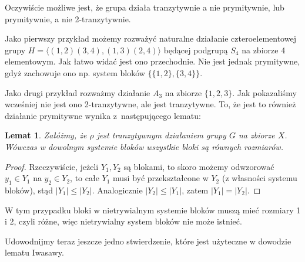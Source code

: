 \documentclass[licencjacka]{pracamgr}
\newtheorem{lemma}{Lemat}[section]
\begin{document}
Oczywiście możliwe jest, że grupa działa tranzytywnie a nie
prymitywnie, lub prymitywnie, a nie 2-tranzytywnie.

Jako pierwszy przykład możemy rozważyć naturalne działanie
czteroelementowej grupy $H= \langle (1,2)(3,4), (1,3)(2,4) \rangle$
będącej podgrupą $S_4$ na zbiorze 4 elementowym. Jak łatwo widać
jest ono przechodnie. Nie jest jednak prymitywne, gdyż zachowuje ono
np. system bloków $\{\{1,2\}, \{3,4\}\}$.

Jako drugi przykład rozważmy działanie $A_3$ na zbiorze $\{1, 2,
3\}$. Jak pokazaliśmy wcześniej nie jest ono 2-tranzytywne, ale jest
tranzytywne. To, że jest to również działanie prymitywne wynika
z~następującego lematu:

\begin{lemma}
    Załóżmy, że $\rho$ jest tranzytywnym działaniem grupy $G$ na zbiorze $X$.
    Wówczas w dowolnym systemie bloków wszystkie bloki są równych rozmiarów.
\end{lemma}
\begin{proof}
Rzeczywiście, jeżeli $Y_1, Y_2$ są blokami, to skoro możemy
odwzorować $y_1 \in Y_1$ na $y_2 \in Y_2$, to całe $Y_1$ musi być
przekształcone w $Y_2$ (z własności systemu bloków), stąd $|Y_1| \le
|Y_2|$. Analogicznie $|Y_2| \le |Y_1|$, zatem $|Y_1| = |Y_2|$.
\end{proof}


W tym przypadku bloki w nietrywialnym systemie bloków muszą mieć
rozmiary 1 i 2, czyli różne, więc nietrywialny system bloków nie
może istnieć.

Udowodnijmy teraz jeszcze jedno stwierdzenie, które jest użyteczne w
dowodzie lematu Iwasawy.
\end{document}
